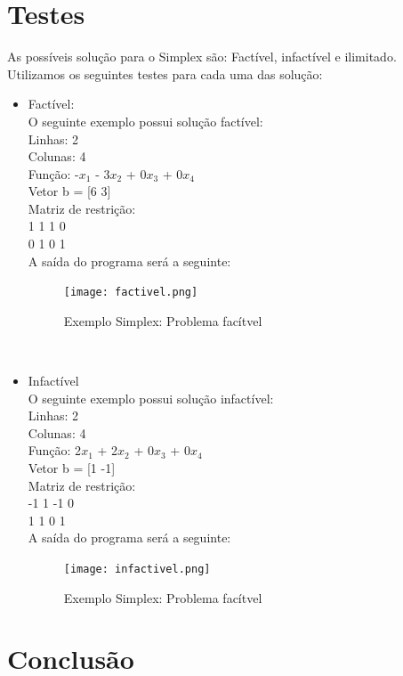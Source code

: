 \documentclass[a4paper]{article}
\begin{document}
\section{Testes}
As poss\'iveis solu\c{c}\~ao para o Simplex s\~ao: Fact\'ivel, infact\'ivel e ilimitado. Utilizamos os seguintes testes para cada uma das solu\c{c}\~ao:
\begin{itemize}
\item Fact\'ivel:
\\
O seguinte exemplo possui solu\c{c}\~ao fact\'ivel:
\\
Linhas: 2
\\
Colunas: 4
\\
Fun\c{c}\~ao: -$x_1$ - 3$x_2$ + 0$x_3$ + 0$x_4$
\\
Vetor b = [6 3]
\\
Matriz de restri\c{c}\~ao:\\
1 1 1 0\\
0 1 0 1\\
A sa\'ida do programa ser\'a a seguinte:
\begin{figure}[h]
\caption{Exemplo Simplex: Problema fac\'itvel}
\texttt{[image: factivel.png]}
\end{figure}
\\
\item Infact\'ivel
\\
O seguinte exemplo possui solu\c{c}\~ao infact\'ivel:
\\
Linhas: 2
\\
Colunas: 4
\\
Fun\c{c}\~ao: 2$x_1$ + 2$x_2$ + 0$x_3$ + 0$x_4$
\\
Vetor b = [1 -1]
\\
Matriz de restri\c{c}\~ao:\\
-1 1 -1 0\\
1 1 0 1\\
A sa\'ida do programa ser\'a a seguinte:
\begin{figure}[h]
\caption{Exemplo Simplex: Problema fac\'itvel}
\texttt{[image: infactivel.png]}
\end{figure}

\end{itemize}
\section{Conclus\~ao}
\end{document}
